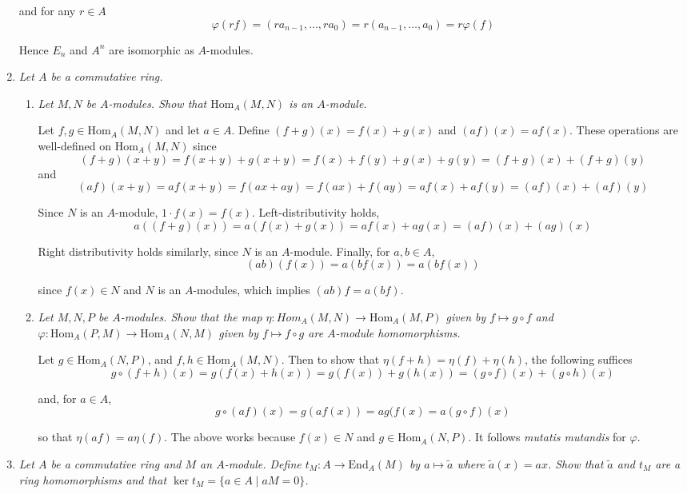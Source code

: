 \documentclass[10pt]{article}
\newcommand{\Hom}{\text{Hom}}
\newcommand{\End}{\text{End}}
\begin{document}
\begin{enumerate}
and for any $r \in A$
\[
\varphi(rf) = (ra_{n-1}, \ldots, ra_0) = r(a_{n-1}, \ldots, a_0) = r\varphi(f)
\]

Hence $E_n$ and $A^n$ are isomorphic as $A$-modules.

\item \emph{Let $A$ be a commutative ring.}
\begin{enumerate}
\item \emph{Let $M,N$ be $A$-modules.  Show that $\Hom_A(M,N)$ is an $A$-module.}

Let $f,g \in \Hom_A(M,N)$ and let $a \in A$.  Define $(f+g)(x) = f(x) + g(x)$ and $(af)(x) = af(x)$.  These operations are well-defined on $\Hom_A(M,N)$ since $$(f+g)(x+y) = f(x+y) + g(x+y) = f(x) + f(y) + g(x) + g(y) = (f+g)(x) + (f+g)(y)$$ and $$(af)(x+y) = af(x+y) = f(ax+ay) = f(ax) + f(ay) = af(x) + af(y) = (af)(x) + (af)(y)$$

Since $N$ is an $A$-module, $1 \cdot f(x) = f(x)$.  Left-distributivity holds, 
\[
a((f+g)(x)) = a(f(x) + g(x)) = af(x) + ag(x) = (af)(x) + (ag)(x)
\]

Right distributivity holds similarly, since $N$ is an $A$-module.  Finally, for $a,b \in A$,
\[
(ab)(f(x)) = a(bf(x)) = a(bf(x))
\]

since $f(x) \in N$ and $N$ is an $A$-modules, which implies $(ab)f = a(bf)$.

\item \emph{Let $M,N,P$ be $A$-modules.  Show that the map $\eta: Hom_A(M,N) \rightarrow \Hom_A(M,P)$ given by $f \mapsto g \circ f$ and $\varphi: \Hom_A(P,M) \rightarrow \Hom_A(N,M)$ given by $f \mapsto f \circ g$ are $A$-module homomorphisms.}

Let $g \in \Hom_A(N,P)$, and $f,h \in \Hom_A(M,N)$.  Then to show that $\eta(f+h) = \eta(f) + \eta(h)$, the following suffices
\[
g \circ(f+h)(x) = g(f(x) + h(x)) = g(f(x)) + g(h(x)) = (g\circ f)(x) + (g \circ h)(x)
\]

and, for $a \in A$,
\[
g \circ (af)(x) = g(af(x)) = ag(f(x) = a(g \circ f)(x)
\]

so that $\eta(af) = a\eta(f)$.  The above works because $f(x) \in N$ and $g \in \Hom_A(N,P)$.  It follows \emph{mutatis mutandis} for $\varphi$.

\end{enumerate}

\item \emph{Let $A$ be a commutative ring and $M$ an $A$-module. Define $t_M: A \rightarrow \End_A(M)$ by $a \mapsto \tilde{a}$ where $\tilde{a}(x) = ax$.  Show that $\tilde{a}$ and $t_M$ are a ring homomorphisms and that $\ker t_M = \{a \in A \mid aM = 0\}$.}


\end{enumerate}
\end{document}
